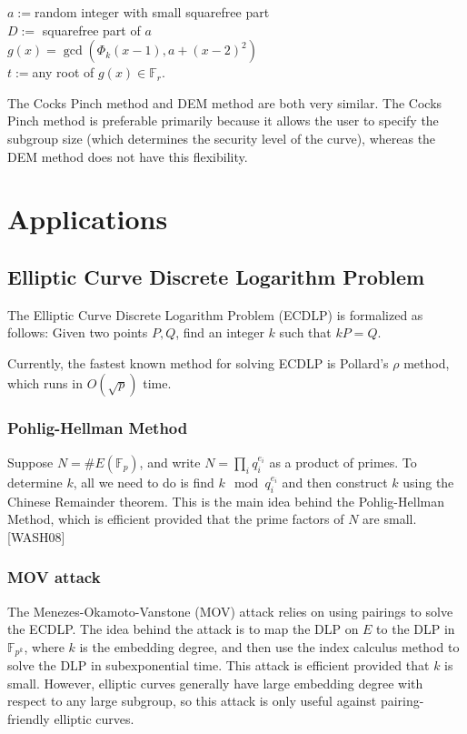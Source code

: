 \documentclass[12pt,twoside]{article}
\begin{document}
\begin{algorithm}[H]
$a:= $random integer with small squarefree part \\
$D := $ squarefree part of $a$ \\
$g(x) = \gcd(\Phi_k(x-1), a+(x-2)^2)$ \\
$t := $any root of $g(x) \in \mathbb F_r$.
\end{algorithm}

The Cocks Pinch method and DEM method are both very similar. The Cocks Pinch method is preferable primarily because it allows the user to specify the subgroup size (which determines the security level of the curve), whereas the DEM method does not have this flexibility. 

\section{Applications} 


\subsection{Elliptic Curve Discrete Logarithm Problem}
The Elliptic Curve Discrete Logarithm Problem (ECDLP) is formalized as follows:
Given two points $P,Q$, find an integer $k$ such that $kP = Q$.

Currently, the fastest known method for solving ECDLP is Pollard's $\rho$ method, which runs in $O(\sqrt p)$ time.

\subsubsection{Pohlig-Hellman Method}
Suppose $N = \#E(\mathbb F_p)$, and write $ N = \prod_{i}q_{i}^{e_{i}}$ as a product of primes. To determine $k$, all we need to do is find $k \mod q^{e_i}_i$ and then construct $k$ using the Chinese Remainder theorem. This is the main idea behind the Pohlig-Hellman Method, which is efficient provided that the prime factors of $N$ are small. [WASH08]


\subsubsection{MOV attack}

The Menezes-Okamoto-Vanstone (MOV) attack relies on using pairings to solve the ECDLP. The idea behind the attack is to map the DLP on $E$ to the DLP in $\mathbb F_{p^k}$, where $k$ is the embedding degree, and then use the index calculus method to solve the DLP in subexponential time. This attack is efficient provided that $k$ is small. However, elliptic curves generally have large embedding degree with respect to any large subgroup, so this attack is only useful against pairing-friendly elliptic curves.



 

\end{document}
